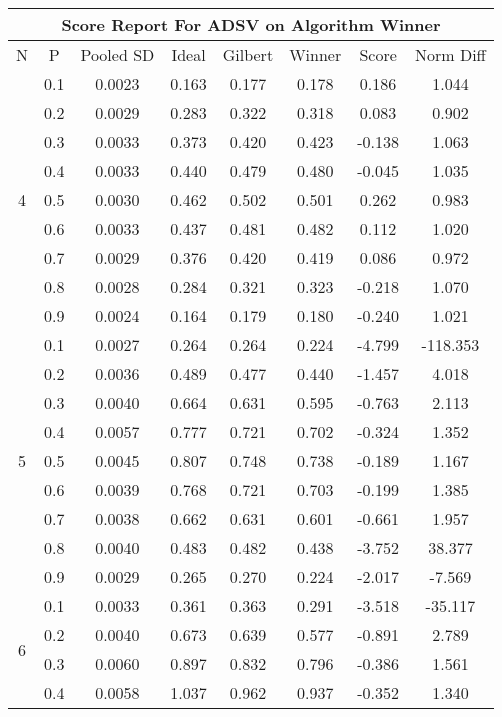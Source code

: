 \documentclass[11pt,a4paper]{report}
\begin{document}
\begin{longtable}{ | c | c || c | c | c | c | c | c | }
\hline
\multicolumn{8}{|c|}{ Score Report For ADSV on Algorithm Winner} \\
\hline
N & P & Pooled SD &  Ideal &  Gilbert & Winner  & Score & Norm Diff \\
 \hline
 \hline
 \endhead
\multirow{9}{*}{4} & 0.1 & 0.0023 & 0.163 & 0.177 & 0.178 & 0.186 & 1.044 \\
 & 0.2 & 0.0029 & 0.283 & 0.322 & 0.318 & 0.083 & 0.902 \\
 & 0.3 & 0.0033 & 0.373 & 0.420 & 0.423 & -0.138 & 1.063 \\
 & 0.4 & 0.0033 & 0.440 & 0.479 & 0.480 & -0.045 & 1.035 \\
 & 0.5 & 0.0030 & 0.462 & 0.502 & 0.501 & 0.262 & 0.983 \\
 & 0.6 & 0.0033 & 0.437 & 0.481 & 0.482 & 0.112 & 1.020 \\
 & 0.7 & 0.0029 & 0.376 & 0.420 & 0.419 & 0.086 & 0.972 \\
 & 0.8 & 0.0028 & 0.284 & 0.321 & 0.323 & -0.218 & 1.070 \\
 & 0.9 & 0.0024 & 0.164 & 0.179 & 0.180 & -0.240 & 1.021 \\
 \hline
\multirow{9}{*}{5} & 0.1 & 0.0027 & 0.264 & 0.264 & 0.224 & -4.799 & -118.353 \\
 & 0.2 & 0.0036 & 0.489 & 0.477 & 0.440 & -1.457 & 4.018 \\
 & 0.3 & 0.0040 & 0.664 & 0.631 & 0.595 & -0.763 & 2.113 \\
 & 0.4 & 0.0057 & 0.777 & 0.721 & 0.702 & -0.324 & 1.352 \\
 & 0.5 & 0.0045 & 0.807 & 0.748 & 0.738 & -0.189 & 1.167 \\
 & 0.6 & 0.0039 & 0.768 & 0.721 & 0.703 & -0.199 & 1.385 \\
 & 0.7 & 0.0038 & 0.662 & 0.631 & 0.601 & -0.661 & 1.957 \\
 & 0.8 & 0.0040 & 0.483 & 0.482 & 0.438 & -3.752 & 38.377 \\
 & 0.9 & 0.0029 & 0.265 & 0.270 & 0.224 & -2.017 & -7.569 \\
 \hline
\multirow{9}{*}{6} & 0.1 & 0.0033 & 0.361 & 0.363 & 0.291 & -3.518 & -35.117 \\
 & 0.2 & 0.0040 & 0.673 & 0.639 & 0.577 & -0.891 & 2.789 \\
 & 0.3 & 0.0060 & 0.897 & 0.832 & 0.796 & -0.386 & 1.561 \\
 & 0.4 & 0.0058 & 1.037 & 0.962 & 0.937 & -0.352 & 1.340 \\

\end{longtable}
\end{document}
